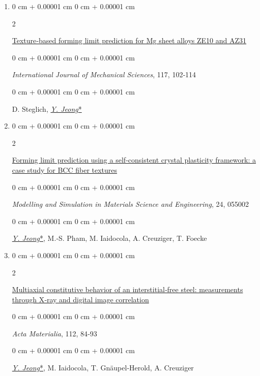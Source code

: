 \documentclass[10pt, letterpaper]{article}
\newenvironment{onecolentry}{
    \begin{adjustwidth}{
        0 cm + 0.00001 cm
    }{
        0 cm + 0.00001 cm
    }
}{
    \end{adjustwidth}
} %
\newenvironment{twocolentry}[2][]{
    \onecolentry
    \def\secondColumn{#2}
    \setcolumnwidth{\fill, 4.5 cm}
    \begin{paracol}{2}
}{
    \switchcolumn \raggedleft \secondColumn
    \end{paracol}
    \endonecolentry
} %
\begin{document}
\begin{enumerate}
        \item
        \begin{twocolentry}{2016}
            \href{http://dx.doi.org/10.1016/j.ijmecsci.2016.08.013}{Texture‑based forming limit prediction for Mg sheet alloys ZE10 and AZ31 }
        \end{twocolentry}
        \begin{onecolentry}
            {\it International Journal of Mechanical Sciences}, 117, 102‑114
        \end{onecolentry}
        \begin{onecolentry}
            D. Steglich, {\underline{\textit{Y. Jeong}*}}
        \end{onecolentry}
        \vspace{0.10 cm}


        \item
        \begin{twocolentry}{2016}
            \href{http://dx.doi.org/10.1088/0965-0393/24/5/055005}{Forming limit prediction using a self‑consistent crystal plasticity framework: a case study for BCC fiber textures}
        \end{twocolentry}
        \begin{onecolentry}
            {\it Modelling and Simulation in Materials Science and Engineering}, 24, 055002
        \end{onecolentry}
        \begin{onecolentry}
            {\underline{\textit{Y. Jeong}*}}, M.‑S. Pham, M. Iaidocola, A. Creuziger, T. Foecke
        \end{onecolentry}
        \vspace{0.10 cm}

        \item
        \begin{twocolentry}{2016}
            \href{http://dx.doi.org/10.1016/j.actamat.2016.04.013}{Multiaxial constitutive behavior of an interstitial‑free steel: measurements through X‑ray and digital image correlation }
        \end{twocolentry}
        \begin{onecolentry}
            {\it Acta Materialia}, 112, 84‑93
        \end{onecolentry}
        \begin{onecolentry}
            {\underline{\textit{Y. Jeong}*}},  M. Iaidocola, T. Gnäupel‑Herold, A. Creuziger
        \end{onecolentry}
        \vspace{0.10 cm}



\end{enumerate}
\end{document}
